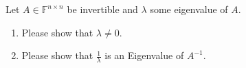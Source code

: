 Let $A \in \mathbb{F}^{n \times n}$ be invertible and $\lambda$ some eigenvalue of $A$.
\begin{enumerate}
	\item Please show that $\lambda \neq 0$.
	\item Please show that $\frac{1}{\lambda}$ is an Eigenvalue of $A^{-1}$.
\end{enumerate}